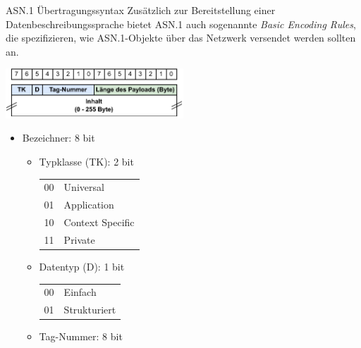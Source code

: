 \begin{defi}{ASN.1 Übertragungssyntax}
    Zusätzlich zur Bereitstellung einer Datenbeschreibungssprache bietet ASN.1 auch sogenannte \emph{Basic Encoding Rules}, die spezifizieren, wie ASN.1-Objekte über das Netzwerk versendet werden sollten an.
    
    \begin{center}
        \includegraphics[width=0.5\textwidth]{includes/figures/defi_asn1.pdf}
    \end{center}
    
    \begin{itemize}
        \item Bezeichner: 8 bit
              
              \begin{itemize}
                  \item Typklasse (TK): 2 bit
                        
                        \begin{tabular}{T|l}
                            00 & Universal        \\
                            01 & Application      \\
                            10 & Context Specific \\
                            11 & Private
                        \end{tabular}
                  \item Datentyp (D): 1 bit
                        
                        \begin{tabular}{T|l}
                            00 & Einfach      \\
                            01 & Strukturiert
                        \end{tabular}
                  \item Tag-Nummer: 8 bit
                        

\end{itemize}
\end{itemize}
\end{defi}
